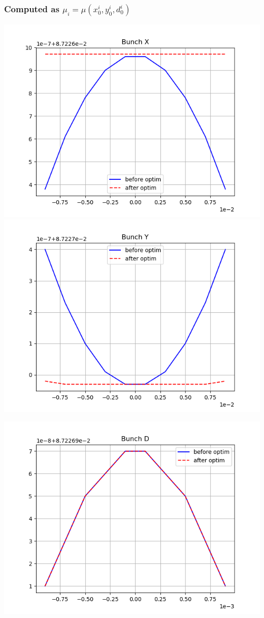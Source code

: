 \documentclass[pdf]{beamer}
\begin{document}
\begin{frame}\frametitle{Computed as $\mu_i = \mu(x_0^i,y_0^i,d_0^i)$}
	\centering
	\includegraphics[scale=.33]{decoh/Xbunch/Wy_vs_Xdecoh0_}%
	\includegraphics[scale=.33]{decoh/Ybunch/Wy_vs_Ydecoh0_}
	
	\includegraphics[scale=.33]{decoh/Dbunch/Wy_vs_Ddecoh0_}
\end{frame}
\end{document}
